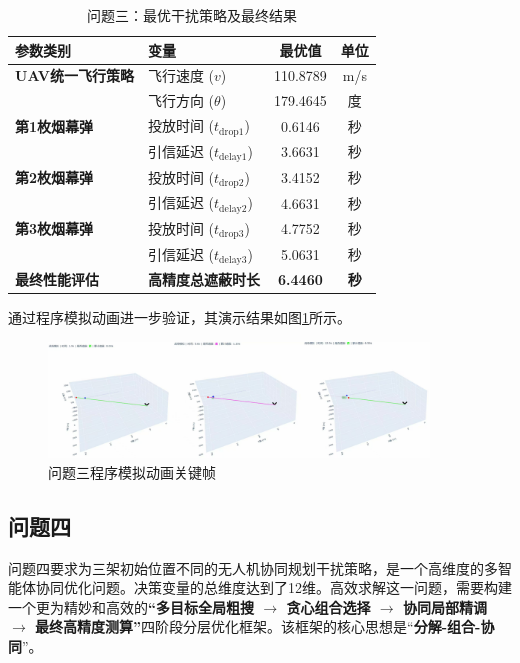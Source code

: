 \documentclass[12pt]{article}
\begin{document}
\begin{CJK}{UTF8}{gbsn}
		\begin{table}[H]
			\centering
			\caption{问题三：最优干扰策略及最终结果}
			\label{tab:results_q3}
			\begin{tabular}{@{}llcc@{}}
				\toprule
				参数类别           & 变量                & 最优值      & 单位 \\ \midrule
				\textbf{UAV统一飞行策略} & 飞行速度 ($v$)        & 110.8789 & m/s  \\
				& 飞行方向 ($\theta$)     & 179.4645 & 度   \\ \midrule
				\textbf{第1枚烟幕弹} & 投放时间 ($t_{\text{drop1}}$) & 0.6146  & 秒   \\
				& 引信延迟 ($t_{\text{delay1}}$) & 3.6631  & 秒   \\ \midrule
				\textbf{第2枚烟幕弹} & 投放时间 ($t_{\text{drop2}}$) & 3.4152 & 秒   \\
				& 引信延迟 ($t_{\text{delay2}}$) & 4.6631  & 秒   \\ \midrule
				\textbf{第3枚烟幕弹} & 投放时间 ($t_{\text{drop3}}$) & 4.7752  & 秒   \\
				& 引信延迟 ($t_{\text{delay3}}$) & 5.0631  & 秒   \\ \midrule
				\textbf{最终性能评估} & \textbf{高精度总遮蔽时长} & \textbf{6.4460 } & \textbf{秒}   \\ \bottomrule
			\end{tabular}
		\end{table}
		
		通过程序模拟动画进一步验证，其演示结果如图\ref{fig:simulation_q3}所示。
		
		\begin{figure}[H]
			\centering
			\includegraphics[width=0.9\textwidth]{pic/sim3.jpg}
			\caption{问题三程序模拟动画关键帧}
			\label{fig:simulation_q3}
		\end{figure}
		
		\subsection{问题四}
		
		
		问题四要求为三架初始位置不同的无人机协同规划干扰策略，是一个高维度的多智能体协同优化问题。决策变量的总维度达到了12维。高效求解这一问题，需要构建一个更为精妙和高效的\textbf{“多目标全局粗搜 $\rightarrow$ 贪心组合选择 $\rightarrow$ 协同局部精调 $\rightarrow$ 最终高精度测算”}四阶段分层优化框架。该框架的核心思想是“\textbf{分解-组合-协同}”。
		

\end{CJK}
\end{document}
